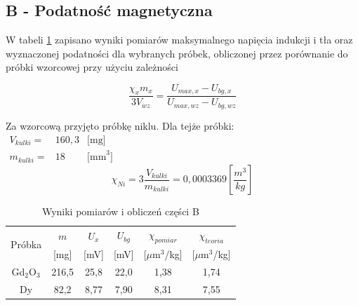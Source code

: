 \documentclass[11pt]{article}
\begin{document}
\subsection*{B - Podatność magnetyczna}
W tabeli \ref{t1} zapisano wyniki pomiarów maksymalnego napięcia indukcji i tła oraz 
wyznaczonej podatności dla wybranych próbek, obliczonej przez porównanie do próbki wzorcowej 
przy użyciu zależności 

\begin{equation}
\frac{\chi_x m_x}{3V_{wz}} = \frac{U_{max,x}-U_{bg,x}}{U_{max,wz}-U_{bg,wz}}
\end{equation}

Za wzorcową przyjęto próbkę niklu. Dla tejże próbki:\\
$\begin{matrix}
	V_{kulki} = &160,3 & \mbox{[mg]} \\
	m_{kulki} = &18 & \mbox{[mm}^3] 
\end{matrix}$
\begin{equation}
\chi_{Ni} = 3\frac{V_{kulki}}{m_{kulki}} = 0,0003369 \left[ \frac{m^3}{kg} \right]
\end{equation}

\begin{table}[h!]
\centering
\caption{Wyniki pomiarów i obliczeń części B}{\label{t1}}
\begin{tabular}{|c|c|c|c|c|c|} \hline
\multirow{2}{*}{Próbka} & $m$ & $U_x$ & $U_{bg}$ & $\chi_{pomiar}$ & $\chi_{teoria}$ \\  
	& [mg] & [mV] & [mV] & [$\mu$m$^3$/kg]&[$\mu$m$^3$/kg] \\ \hline 
Gd$_2$O$_3$ & 216,5 & 25,8 & 22,0 & 1,38 & 1,74 \\ \hline
Dy & 82,2 & 8,77 & 7,90 & 8,31 & 7,55 \\ \hline
\end{tabular}
\end{table}
\end{document}
